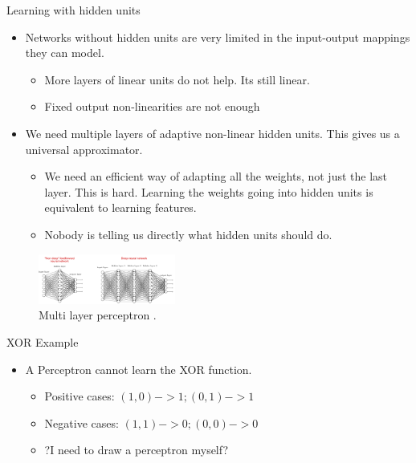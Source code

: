\begin{frame}{Learning with hidden units}
    \begin{itemize}
        \item Networks without hidden units are very limited in the
input-output mappings they can model.
        \begin{itemize}
            \item More layers of linear units do not help. Its still linear.
            \item Fixed output non-linearities are not enough
        \end{itemize}
        \item We need multiple layers of adaptive non-linear hidden
units. This gives us a universal approximator.
        \begin{itemize}
            \item We need an efficient way of adapting all the weights,
not just the last layer. This is hard. Learning the
weights going into hidden units is equivalent to
learning features.
            \item Nobody is telling us directly what hidden units should
do.
        \end{itemize}
    \end{itemize}
    \begin{figure}[H]
		\centering
		\includegraphics[width=0.4\textwidth]{Images/MLP1.png}
		\caption{Multi layer perceptron \cite{https://www.projectpro.io/article/deep-learning-algorithms/443}.}
	\end{figure}
\end{frame}

\begin{frame}{XOR Example}
    \begin{itemize}
        \item A Perceptron cannot learn the XOR function. 
        \begin{itemize}
            \item Positive cases: $(1, 0) -> 1; (0, 1) -> 1$
            \item Negative cases: $(1, 1) -> 0; (0, 0) -> 0$
            \item ?I need to draw a perceptron myself?
        \end{itemize}
    \end{itemize}
\end{frame}

